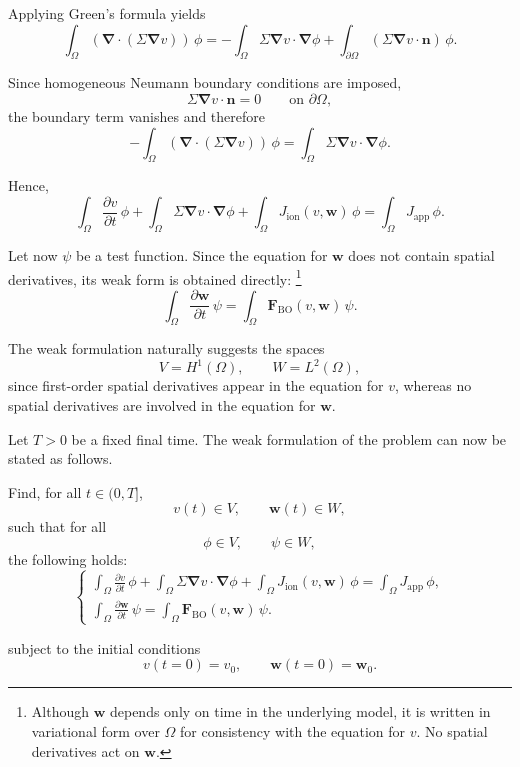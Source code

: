 \documentclass{Configuration_Files/PoliMi3i_thesis}
\begin{document}
Applying Green's formula yields
\[
\int_\Omega (\boldsymbol{\nabla} \cdot (\Sigma \boldsymbol{\nabla} v))\,\phi
=
- \int_\Omega \Sigma \boldsymbol{\nabla} v \cdot \boldsymbol{\nabla} \phi
+ \int_{\partial\Omega}
(\Sigma \boldsymbol{\nabla} v \cdot \mathbf n)\,\phi .
\]

Since homogeneous Neumann boundary conditions are imposed,
\[
\Sigma \boldsymbol{\nabla} v \cdot \mathbf n = 0
\qquad \text{on } \partial\Omega,
\]
the boundary term vanishes and therefore
\[
-\int_\Omega (\boldsymbol{\nabla} \cdot (\Sigma \boldsymbol{\nabla} v))\,\phi
=
\int_\Omega \Sigma \boldsymbol{\nabla} v \cdot \boldsymbol{\nabla} \phi.
\]

Hence,
\[
\int_\Omega \frac{\partial v}{\partial t}\,\phi
+ \int_\Omega \Sigma \boldsymbol{\nabla} v \cdot \boldsymbol{\nabla} \phi
+ \int_\Omega J_{\mathrm{ion}}(v,\mathbf{w})\,\phi
=
\int_\Omega J_{\mathrm{app}}\,\phi.
\]

Let now $\psi$ be a test function. Since the equation for $\mathbf w$ does not contain spatial derivatives, its weak form is obtained directly:
\footnote{
Although $\mathbf{w}$ depends only on time in the underlying model, it is written in variational form over $\Omega$ for consistency with the equation for $v$. No spatial derivatives act on $\mathbf{w}$.
}
\[
\int_\Omega \frac{\partial \mathbf w}{\partial t}\,\psi
=
\int_\Omega \mathbf F_{\mathrm{BO}}(v,\mathbf w)\,\psi.
\]

The weak formulation naturally suggests the spaces
\[
V = H^1(\Omega),
\qquad
W = L^2(\Omega),
\]
since first-order spatial derivatives appear in the equation for $v$,
whereas no spatial derivatives are involved in the equation for
$\mathbf w$.

Let $T>0$ be a fixed final time.
The weak formulation of the problem can now be stated as follows.
\begin{tcolorbox}[title=Weak Formulation,colback=white,colframe=black]
Find, for all $t \in (0,T]$, 
\[
v(t) \in V, \qquad \mathbf{w}(t) \in W ,
\]
such that for all
\[
\phi \in V, \qquad \psi \in W,
\]
the following holds:
\[
\left\{
\begin{array}{l}
\displaystyle
\int_\Omega \frac{\partial v}{\partial t}\,\phi
+ \int_\Omega \Sigma \boldsymbol{\nabla} v \cdot \boldsymbol{\nabla} \phi
+ \int_\Omega J_{\mathrm{ion}}(v,\mathbf{w})\,\phi
=
\int_\Omega J_{\mathrm{app}}\,\phi,
\\[0.8em]
\displaystyle
\int_\Omega \frac{\partial \mathbf{w}}{\partial t}\,\psi
=
\int_\Omega \mathbf{F}_{\mathrm{BO}}(v,\mathbf{w})\,\psi.
\end{array}
\right.
\]

subject to the initial conditions
\[
v(t=0)=v_0,
\qquad
\mathbf{w}(t=0)=\mathbf{w}_0.
\]
\end{tcolorbox}
\end{document}
